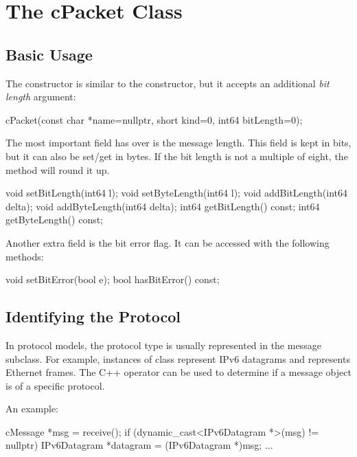\section{The cPacket Class}
\label{sec:msgs:cpacket}

\subsection{Basic Usage}
\label{sec:messages:cpacket-basic-usage}

The  constructor is similar to the 
constructor, but it accepts an additional \textit{bit length} argument:

\begin{cpp}
cPacket(const char *name=nullptr, short kind=0, int64 bitLength=0);
\end{cpp}

The most important field  has over  is
the message length. This field is kept in bits, but it can also be
set/get in bytes. If the bit length is not a multiple of eight, the
 method will round it up.

\begin{cpp}
void setBitLength(int64 l);
void setByteLength(int64 l);
void addBitLength(int64 delta);
void addByteLength(int64 delta);
int64 getBitLength() const;
int64 getByteLength() const;
\end{cpp}

Another extra field is the bit error flag. It can be accessed with the
following methods:

\begin{cpp}
void setBitError(bool e);
bool hasBitError() const;
\end{cpp}


\subsection{Identifying the Protocol}
\label{sec:messages:identifying-protocol-of-packet}

In {\opp} protocol models, the protocol type is usually represented in the
message subclass. For example, instances of class 
represent IPv6 datagrams and  represents Ethernet
frames. The C++  operator can be used to determine if a
message object is of a specific protocol.

An example:

\begin{cpp}
cMessage *msg = receive();
if (dynamic_cast<IPv6Datagram *>(msg) != nullptr)
{
    IPv6Datagram *datagram = (IPv6Datagram *)msg;
    ...
}
\end{cpp}



